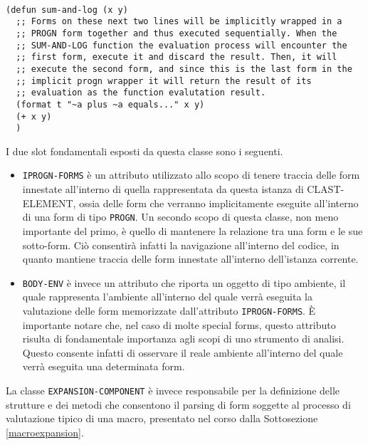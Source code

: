 \begin{lstlisting}[caption=Esempio di costrutto che compie un utilizzo del
costrutto \texttt{PROGN} in modo implicito]

(defun sum-and-log (x y)
  ;; Forms on these next two lines will be implicitly wrapped in a
  ;; PROGN form together and thus executed sequentially. When the
  ;; SUM-AND-LOG function the evaluation process will encounter the
  ;; first form, execute it and discard the result. Then, it will
  ;; execute the second form, and since this is the last form in the
  ;; implicit progn wrapper it will return the result of its
  ;; evaluation as the function evalutation result.
  (format t "~a plus ~a equals..." x y)
  (+ x y)
  )

\end{lstlisting}

I due slot fondamentali esposti da questa classe sono i seguenti.

\begin{itemize}

\item \texttt{IPROGN-FORMS} è un attributo utilizzato allo scopo di tenere
traccia delle form innestate all’interno di quella rappresentata da questa
istanza di CLAST-ELEMENT, ossia delle form che verranno implicitamente
eseguite all’interno di una form di tipo \texttt{PROGN}. Un secondo scopo di
questa classe, non meno importante del primo, è quello di mantenere la
relazione tra una form e le sue sotto-form. Ciò consentirà infatti la
navigazione all'interno del codice, in quanto mantiene traccia delle form
innestate all'interno dell'istanza corrente.

\item \texttt{BODY-ENV} è invece un attributo che riporta un oggetto di tipo
ambiente, il quale rappresenta l'ambiente all’interno del quale verrà eseguita
la valutazione delle form memorizzate dall’attributo \texttt{IPROGN-FORMS}. È
importante notare che, nel caso di molte special forms, questo attributo risulta
di fondamentale importanza agli scopi di uno strumento di analisi. Questo
consente infatti di osservare il reale ambiente all'interno del quale verrà
eseguita una determinata form.

\end{itemize}

La classe \texttt{EXPANSION-COMPONENT} è invece responsabile per la
definizione delle strutture e dei metodi che consentono il parsing di form
soggette al processo di valutazione tipico di una macro, presentato nel corso
dalla Sottosezione \ref{macroexpansion}.

